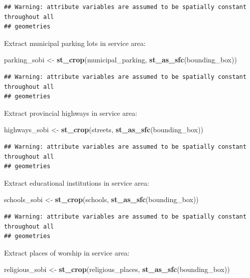 \documentclass[
]{article}
\newenvironment{Shaded}{\begin{snugshade}}{\end{snugshade}}
\newcommand{\KeywordTok}[1]{\textcolor[rgb]{0.13,0.29,0.53}{\textbf{#1}}}
\newcommand{\NormalTok}[1]{#1}
\newcommand{\StringTok}[1]{\textcolor[rgb]{0.31,0.60,0.02}{#1}}
\begin{document}
\begin{verbatim}
## Warning: attribute variables are assumed to be spatially constant throughout all
## geometries
\end{verbatim}

Extract municipal parking lots in service area:

\begin{Shaded}
\begin{Highlighting}[]
\NormalTok{parking_sobi <-}\StringTok{ }\KeywordTok{st_crop}\NormalTok{(municipal_parking, }\KeywordTok{st_as_sfc}\NormalTok{(bounding_box))}
\end{Highlighting}
\end{Shaded}

\begin{verbatim}
## Warning: attribute variables are assumed to be spatially constant throughout all
## geometries
\end{verbatim}

Extract provincial highways in service area:

\begin{Shaded}
\begin{Highlighting}[]
\NormalTok{highways_sobi <-}\StringTok{ }\KeywordTok{st_crop}\NormalTok{(streets, }\KeywordTok{st_as_sfc}\NormalTok{(bounding_box))}
\end{Highlighting}
\end{Shaded}

\begin{verbatim}
## Warning: attribute variables are assumed to be spatially constant throughout all
## geometries
\end{verbatim}

Extract educational institutions in service area:

\begin{Shaded}
\begin{Highlighting}[]
\NormalTok{schools_sobi <-}\StringTok{ }\KeywordTok{st_crop}\NormalTok{(schools, }\KeywordTok{st_as_sfc}\NormalTok{(bounding_box))}
\end{Highlighting}
\end{Shaded}

\begin{verbatim}
## Warning: attribute variables are assumed to be spatially constant throughout all
## geometries
\end{verbatim}

Extract places of worship in service area:

\begin{Shaded}
\begin{Highlighting}[]
\NormalTok{religious_sobi <-}\StringTok{ }\KeywordTok{st_crop}\NormalTok{(religious_places, }\KeywordTok{st_as_sfc}\NormalTok{(bounding_box))}
\end{Highlighting}
\end{Shaded}
\end{document}
